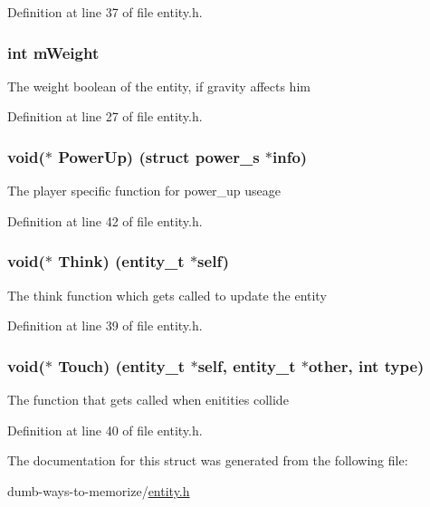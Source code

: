 Definition at line 37 of file entity.\+h.

\subsubsection[{\texorpdfstring{m\+Weight}{mWeight}}]{\setlength{\rightskip}{0pt plus 5cm}int m\+Weight}\hypertarget{structentity__s_a069df5fe6b0f5a8eb03b0cc4c2e0ba43}{}\label{structentity__s_a069df5fe6b0f5a8eb03b0cc4c2e0ba43}
The weight boolean of the entity, if gravity affects him 

Definition at line 27 of file entity.\+h.

\subsubsection[{\texorpdfstring{Power\+Up}{PowerUp}}]{\setlength{\rightskip}{0pt plus 5cm}void($\ast$ Power\+Up) (struct {\bf power\+\_\+s} $\ast$info)}\hypertarget{structentity__s_ad1606f41f8e2d6ffa8da068d620a102e}{}\label{structentity__s_ad1606f41f8e2d6ffa8da068d620a102e}
The player specific function for power\+\_\+up useage 

Definition at line 42 of file entity.\+h.

\subsubsection[{\texorpdfstring{Think}{Think}}]{\setlength{\rightskip}{0pt plus 5cm}void($\ast$ Think) ({\bf entity\+\_\+t} $\ast$self)}\hypertarget{structentity__s_ae045b7ba608e955e791f8af8507b78a4}{}\label{structentity__s_ae045b7ba608e955e791f8af8507b78a4}
The think function which gets called to update the entity 

Definition at line 39 of file entity.\+h.

\subsubsection[{\texorpdfstring{Touch}{Touch}}]{\setlength{\rightskip}{0pt plus 5cm}void($\ast$ Touch) ({\bf entity\+\_\+t} $\ast$self, {\bf entity\+\_\+t} $\ast$other, int type)}\hypertarget{structentity__s_af5c032961c1c6bca1832a0cb3fb34321}{}\label{structentity__s_af5c032961c1c6bca1832a0cb3fb34321}
The function that gets called when enitities collide 

Definition at line 40 of file entity.\+h.



The documentation for this struct was generated from the following file\+:\begin{DoxyCompactItemize}
\item 
dumb-\/ways-\/to-\/memorize/\hyperlink{entity_8h}{entity.\+h}\end{DoxyCompactItemize}
